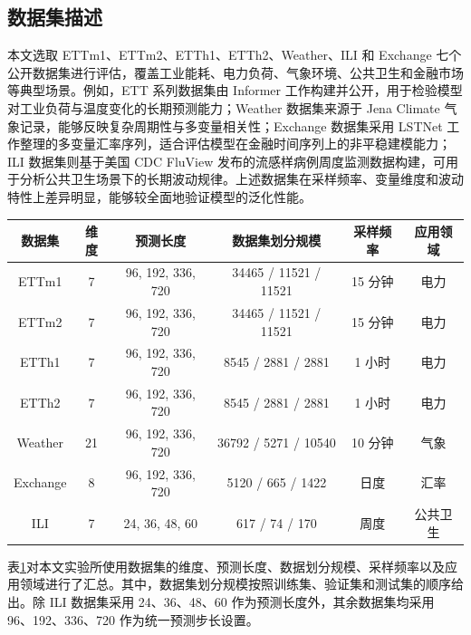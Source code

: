 \subsection{数据集描述} 本文选取 ETTm1、ETTm2、ETTh1、ETTh2、Weather、ILI 和 Exchange 七个公开数据集进行评估，覆盖工业能耗、电力负荷、气象环境、公共卫生和金融市场等典型场景。例如，ETT 系列数据集由 Informer 工作构建并公开，用于检验模型对工业负荷与温度变化的长期预测能力；Weather 数据集来源于 Jena Climate 气象记录，能够反映复杂周期性与多变量相关性\cite{tensorflow2024jena}；Exchange 数据集采用 LSTNet 工作整理的多变量汇率序列，适合评估模型在金融时间序列上的非平稳建模能力\cite{lai2018lstnet}；ILI 数据集则基于美国 CDC FluView 发布的流感样病例周度监测数据构建，可用于分析公共卫生场景下的长期波动规律\cite{cdc2025fluview}。上述数据集在采样频率、变量维度和波动特性上差异明显，能够较全面地验证模型的泛化性能。 \begin{table}[!htbp]
\centering
\scriptsize
\setlength{\tabcolsep}{4.5pt}
\renewcommand{\arraystretch}{0.9}
\label{tab:chap2-datasets}
\begin{tabular}{c|c|c|c|c|c}
\toprule
\textbf{数据集} & \textbf{维度} & \textbf{预测长度} & \textbf{数据集划分规模} & \textbf{采样频率} & \textbf{应用领域} \\
\midrule
ETTm1 & 7 & 96, 192, 336, 720 & 34465 / 11521 / 11521 & 15 分钟 & 电力 \\
\midrule
ETTm2 & 7 & 96, 192, 336, 720 & 34465 / 11521 / 11521 & 15 分钟 & 电力 \\
\midrule
ETTh1 & 7 & 96, 192, 336, 720 & 8545 / 2881 / 2881 & 1 小时 & 电力 \\
\midrule
ETTh2 & 7 & 96, 192, 336, 720 & 8545 / 2881 / 2881 & 1 小时 & 电力 \\
\midrule
Weather & 21 & 96, 192, 336, 720 & 36792 / 5271 / 10540 & 10 分钟 & 气象 \\
\midrule
Exchange & 8 & 96, 192, 336, 720 & 5120 / 665 / 1422 & 日度 & 汇率 \\
\midrule
ILI & 7 & 24, 36, 48, 60 & 617 / 74 / 170 & 周度 & 公共卫生 \\
\bottomrule
\end{tabular}
\end{table} 表\ref{tab:chap2-datasets}对本文实验所使用数据集的维度、预测长度、数据划分规模、采样频率以及应用领域进行了汇总。其中，数据集划分规模按照训练集、验证集和测试集的顺序给出。除 ILI 数据集采用 24、36、48、60 作为预测长度外，其余数据集均采用 96、192、336、720 作为统一预测步长设置。
